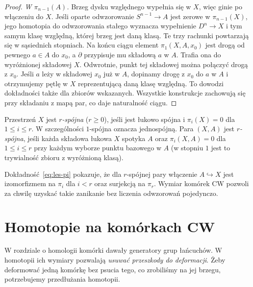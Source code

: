 \begin{proof}
\emph{W $\pi_{n-1}(A)$.} Brzeg
dysku względnego wypełnia
się w $X$, więc ginie
po włączeniu do $X$.
Jeśli oparte odwzorowanie
$S^{n-1}\to A$ jest
zerowe w $\pi_{n-1}(X)$,
jego homotopia do odwzorowania
stałego wyznacza wypełnienie
$D^n\to X$ i tym samym
klasę względną, której
brzeg jest daną klasą.
Te trzy rachunki powtarzają się w sąsiednich stopniach.
Na końcu ciągu element $\pi_1(X,A,x_0)$ jest drogą
od pewnego $a\in A$ do $x_0$, a $\partial$ przypisuje mu
składową $a$ w $A$. Trafia ona do wyróżnionej składowej $X$.
Odwrotnie, punkt tej składowej można połączyć drogą z $x_0$.
Jeśli $a$ leży w składowej $x_0$ już w $A$, dopinamy drogę
z $x_0$ do $a$ w $A$ i otrzymujemy pętlę w $X$ reprezentującą
daną klasę względną. To dowodzi dokładności także dla zbiorów wskazanych.
Wszystkie konstrukcje zachowują się przy składaniu z mapą par,
co daje naturalność ciągu.
\end{proof}

\begin{definicja}
\label{def:spojnosc-homotopijna}
Przestrzeń $X$ jest
\emph{$r$-spójna} ($r\geq0$),
jeśli jest łukowo spójna
i $\pi_i(X)=0$ dla $1\leq i\leq r$.
W szczególności $1$-spójna
oznacza jednospójną.
Para $(X,A)$ jest
\emph{$r$-spójna}, jeśli
każda składowa łukowa $X$
spotyka $A$ oraz
$\pi_i(X,A)=0$ dla
$1\leq i\leq r$ przy każdym wyborze punktu bazowego w $A$
(w stopniu $1$ jest to
trywialność zbioru
z wyróżnioną klasą).
\end{definicja}

Dokładność~\eqref{eq:les-pi}
pokazuje, że dla $r$-spójnej
pary włączenie $A\hookrightarrow X$
jest izomorfizmem na
$\pi_i$ dla $i<r$ oraz
surjekcją na $\pi_r$.
Wymiar komórek CW pozwoli
za chwilę uzyskać takie
zanikanie bez liczenia odwzorowań
pojedynczo.

\section{Homotopie na komórkach CW}
\label{sec:pi-n-cw}

W rozdziale o homologii komórki dawały
generatory grup łańcuchów. W homotopii
ich wymiary pozwalają \emph{usuwać
przeszkody do deformacji}. Żeby
deformować jedną komórkę bez psucia
tego, co zrobiliśmy na jej brzegu,
potrzebujemy przedłużania homotopii.

